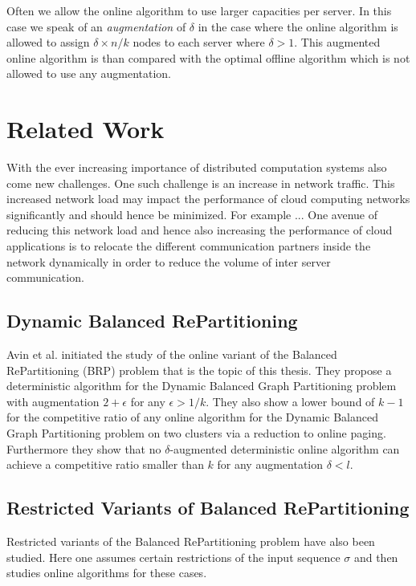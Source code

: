 \documentclass[a4paper,xcolor=dvipsnames, tikz, 12pt]{article}
\newcommand{\opt}{\text{O{\scriptsize PT}}}
\theoremstyle{definition}
\begin{document}
	Often we allow the online algorithm to use larger capacities per server. In this case we speak of an \textit{augmentation} of $\delta$ in the case where the online algorithm is allowed to assign $\delta\times n/k$ nodes to each server where $\delta>1$. This augmented online algorithm is than compared with the optimal offline algorithm \opt{} which is not allowed to use any augmentation.
	
	\section{Related Work}
	With the ever increasing importance of distributed computation systems also come new challenges. One such challenge is an increase in network traffic. This increased network load may impact the performance of cloud computing networks significantly and should hence be minimized. For example ...%
	One avenue of reducing this network load and hence also increasing the performance of cloud applications is to relocate the different communication partners inside the network dynamically in order to reduce the volume of inter server communication.
	
	
	\subsection{Dynamic Balanced RePartitioning}
	Avin et al.\cite{Avin2015} initiated the study of the online variant of the Balanced RePartitioning (BRP) problem that is the topic of this thesis. They propose a deterministic algorithm for the Dynamic Balanced Graph Partitioning problem with augmentation $2+\epsilon$ for any $\epsilon>1/k$. They also show a lower bound of $k-1$ for the competitive ratio of any online algorithm for the Dynamic Balanced Graph Partitioning problem on two clusters via a reduction to online paging. Furthermore they show that no $\delta$-augmented deterministic online algorithm can achieve a competitive ratio smaller than $k$ for any augmentation $\delta<l$. %
	
	
	\subsection{Restricted Variants of Balanced RePartitioning}
	Restricted variants of the Balanced RePartitioning problem have also been studied. Here one assumes certain restrictions of the input sequence $\sigma$ and then studies online algorithms for these cases. 
	
\end{document}
